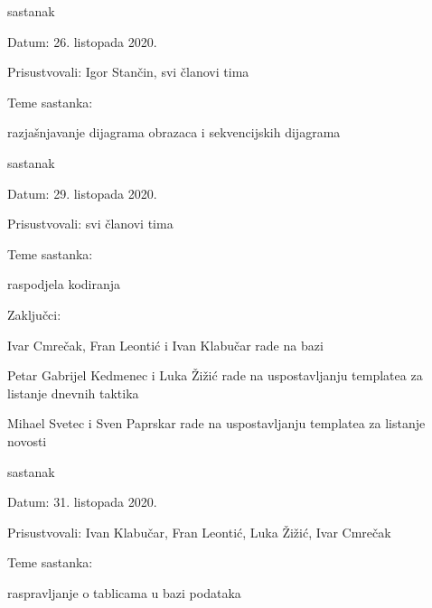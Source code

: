\begin{packed_enum}
			\item  sastanak
			\item[] \begin{packed_item}
				\item Datum: 26. listopada 2020. 
				\item Prisustvovali: Igor Stančin, svi članovi tima
				\item Teme sastanka:
				\begin{packed_item}
					\item  razjašnjavanje dijagrama obrazaca i sekvencijskih dijagrama
				\end{packed_item}
			\end{packed_item}
			
			\item  sastanak
			\item[] \begin{packed_item}
				\item Datum: 29. listopada 2020. 
				\item Prisustvovali: svi članovi tima
				\item Teme sastanka:
				\begin{packed_item}
					\item  raspodjela kodiranja
				\end{packed_item}
				\item Zaključci:
				\begin{packed_item}
					\item Ivar Cmrečak, Fran Leontić i Ivan Klabučar rade na bazi
					\item Petar Gabrijel Kedmenec i Luka Žižić rade na uspostavljanju templatea za listanje dnevnih taktika
					\item Mihael Svetec i Sven Paprskar rade na uspostavljanju templatea za listanje novosti
				\end{packed_item}
			\end{packed_item}
		
			\item  sastanak
			\item[] \begin{packed_item}
				\item Datum: 31. listopada 2020. 
				\item Prisustvovali: Ivan Klabučar, Fran Leontić, Luka Žižić, Ivar Cmrečak
				\item Teme sastanka:
				\begin{packed_item}
					\item  raspravljanje o tablicama u bazi podataka
				\end{packed_item}
			\end{packed_item}
		

\end{packed_enum}
